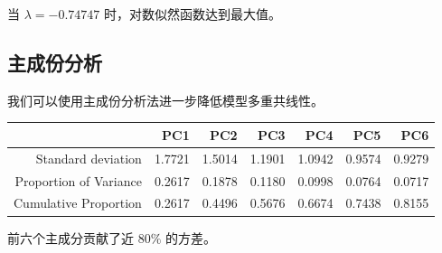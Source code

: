 \documentclass[fontset=ubuntu]{ctexart}
\begin{document}
            当 $\lambda = -0.74747$ 时，对数似然函数达到最大值。

        \subsection{主成份分析}
            我们可以使用主成份分析法进一步降低模型多重共线性。
            \begin{table}[ht]
                \centering
                \begin{tabular}{rrrrrrr}
                    \hline
                    & PC1 & PC2 & PC3 & PC4 & PC5 & PC6 \\ 
                    \hline
                    Standard deviation & 1.7721 & 1.5014 & 1.1901 & 1.0942 & 0.9574 & 0.9279 \\ 
                    Proportion of Variance & 0.2617 & 0.1878 & 0.1180 & 0.0998 & 0.0764 & 0.0717  \\ 
                    Cumulative Proportion & 0.2617 & 0.4496 & 0.5676 & 0.6674 & 0.7438 & 0.8155 \\ 
                    \hline
                \end{tabular}
            \end{table}
            
            前六个主成分贡献了近 $80\%$ 的方差。
\end{document}
